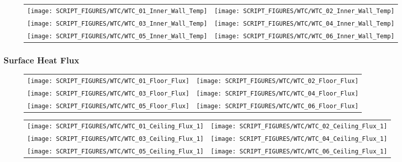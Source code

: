 \begin{figure}[!ht]
\begin{tabular*}{\textwidth}{l@{\extracolsep{\fill}}r}
\texttt{[image: SCRIPT\_FIGURES/WTC/WTC\_01\_Inner\_Wall\_Temp]} &
\texttt{[image: SCRIPT\_FIGURES/WTC/WTC\_02\_Inner\_Wall\_Temp]} \\
\texttt{[image: SCRIPT\_FIGURES/WTC/WTC\_03\_Inner\_Wall\_Temp]} &
\texttt{[image: SCRIPT\_FIGURES/WTC/WTC\_04\_Inner\_Wall\_Temp]} \\
\texttt{[image: SCRIPT\_FIGURES/WTC/WTC\_05\_Inner\_Wall\_Temp]} &
\texttt{[image: SCRIPT\_FIGURES/WTC/WTC\_06\_Inner\_Wall\_Temp]}
\end{tabular*}
\label{NIST_WTC_Inner_Wall}
\end{figure}

\clearpage

\subsubsection{Surface Heat Flux}

\begin{figure}[!ht]
\begin{tabular*}{\textwidth}{l@{\extracolsep{\fill}}r}
\texttt{[image: SCRIPT\_FIGURES/WTC/WTC\_01\_Floor\_Flux]} &
\texttt{[image: SCRIPT\_FIGURES/WTC/WTC\_02\_Floor\_Flux]} \\
\texttt{[image: SCRIPT\_FIGURES/WTC/WTC\_03\_Floor\_Flux]} &
\texttt{[image: SCRIPT\_FIGURES/WTC/WTC\_04\_Floor\_Flux]} \\
\texttt{[image: SCRIPT\_FIGURES/WTC/WTC\_05\_Floor\_Flux]} &
\texttt{[image: SCRIPT\_FIGURES/WTC/WTC\_06\_Floor\_Flux]}
\end{tabular*}
\label{NIST_WTC_Floor_Flux}
\end{figure}

\begin{figure}[!ht]
\begin{tabular*}{\textwidth}{l@{\extracolsep{\fill}}r}
\texttt{[image: SCRIPT\_FIGURES/WTC/WTC\_01\_Ceiling\_Flux\_1]} &
\texttt{[image: SCRIPT\_FIGURES/WTC/WTC\_02\_Ceiling\_Flux\_1]} \\
\texttt{[image: SCRIPT\_FIGURES/WTC/WTC\_03\_Ceiling\_Flux\_1]} &
\texttt{[image: SCRIPT\_FIGURES/WTC/WTC\_04\_Ceiling\_Flux\_1]} \\
\texttt{[image: SCRIPT\_FIGURES/WTC/WTC\_05\_Ceiling\_Flux\_1]} &
\texttt{[image: SCRIPT\_FIGURES/WTC/WTC\_06\_Ceiling\_Flux\_1]}
\end{tabular*}
\label{NIST_WTC_Ceiling_Flux_1}
\end{figure}

